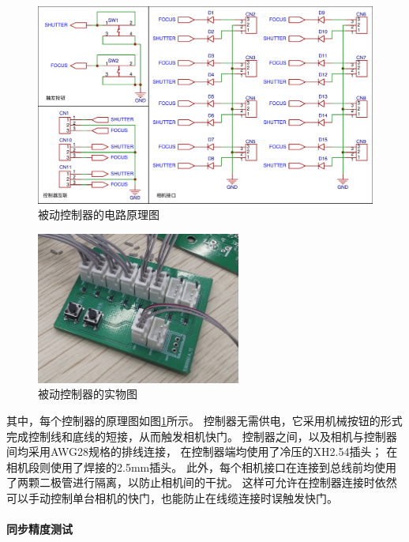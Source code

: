 \begin{figure}
\includegraphics[width=\textwidth]{figures/passive_sync_schematic}
\caption{被动控制器的电路原理图}
\label{fig:passive_sync_schematic}
\end{figure}

\begin{figure}
\centering
\includegraphics[height=5cm]{figures/passive_sync_controller}
\caption{被动控制器的实物图}
\end{figure}

其中，每个控制器的原理图如图\ref{fig:passive_sync_schematic}所示。
控制器无需供电，它采用机械按钮的形式完成控制线和底线的短接，从而触发相机快门。
控制器之间，以及相机与控制器间均采用AWG28规格的排线连接，
在控制器端均使用了冷压的XH2.54插头；
在相机段则使用了焊接的2.5mm插头。
此外，每个相机接口在连接到总线前均使用了两颗二极管进行隔离，以防止相机间的干扰。
这样可允许在控制器连接时依然可以手动控制单台相机的快门，也能防止在线缆连接时误触发快门。

\paragraph{同步精度测试}

